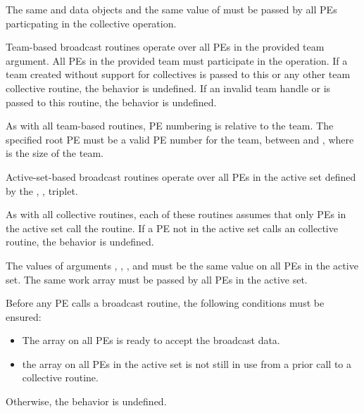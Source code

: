 \begin{apidefinition}
{    {\color{Green}
    The same \dest{} and \source{} data objects and the same value of  must be
    passed by all \acp{PE} particpating in the collective operation.

    Team-based broadcast routines operate over all \acp{PE} in the provided team argument. All
    \acp{PE} in the provided team must participate in the operation. If a team created without
    support for collectives is passed to this or any other team collective routine, the
    behavior is undefined. If an invalid team handle or 
    is passed to this routine, the behavior is undefined.

    As with all team-based \openshmem routines, \ac{PE}
    numbering is relative to the team. The specified root \ac{PE} must be a valid \ac{PE}
    number for the team, between  and , where  is
    the size of the team.

    Active-set-based broadcast routines operate over all \acp{PE} in the active set
    defined by the , ,  triplet.
    }

    As with all  \oldtext{\openshmem} collective routines,
    each of these routines assumes that
    only \acp{PE} in the active set call the routine.  If a \ac{PE} not in the
    active set calls an  \oldtext{\openshmem}
    collective routine, the behavior is undefined.
    
    The values of arguments , , ,
    and  must be the same value on all \acp{PE} in the active set.
    The same  work array must be passed by all \acp{PE} in the active set.

    Before any \ac{PE} calls a broadcast routine, the following conditions must be ensured:
    \begin{itemize}
    \item The \dest{} array on all \acp{PE} 
      is ready to accept the broadcast data.
    \item {} the
       array on all \acp{PE} in the
      active set is not still in use from a prior call to a collective
      \openshmem routine.
    \end{itemize}
    Otherwise, the behavior is undefined.
    
}
\end{apidefinition}
